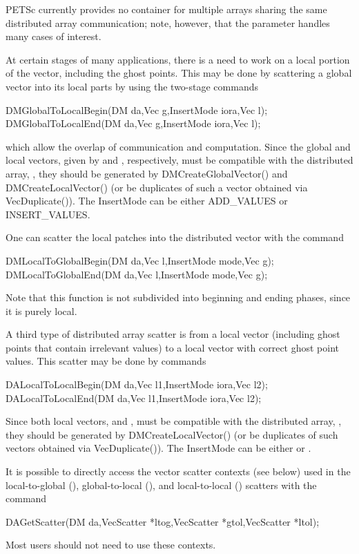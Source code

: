PETSc currently provides no container for multiple arrays sharing the
same distributed array communication; note, however, that the 
parameter handles many cases of interest.

At certain stages of many applications, there is a need to work 
on a local portion of the vector, including the ghost points. 
This may be done by scattering a global vector into its 
local parts by using the two-stage commands
\begin{tabbing}
  DMGlobalToLocalBegin(DM da,Vec g,InsertMode iora,Vec l);\\
  DMGlobalToLocalEnd(DM da,Vec g,InsertMode iora,Vec l);
\end{tabbing}
which allow the overlap of communication and computation.
Since the global and local vectors, given by  and , respectively,
must be compatible with the distributed array, , they should be
generated by DMCreateGlobalVector() 
and DMCreateLocalVector()
(or be duplicates of such a vector obtained via VecDuplicate()).
The InsertMode can be either ADD_VALUES or INSERT_VALUES.

One can scatter the local patches into the distributed vector
with the command
\begin{tabbing}
  DMLocalToGlobalBegin(DM da,Vec l,InsertMode mode,Vec g);
  DMLocalToGlobalEnd(DM da,Vec l,InsertMode mode,Vec g);
\end{tabbing}
Note that this function is not
subdivided into beginning and ending phases, since it is purely local.

A third type of distributed array scatter is from a local
vector (including ghost points that contain irrelevant values) to 
a local vector with correct ghost point values. 
This scatter may be done by
commands
\begin{tabbing}
  DALocalToLocalBegin(DM da,Vec l1,InsertMode iora,Vec l2);\\
  DALocalToLocalEnd(DM da,Vec l1,InsertMode iora,Vec l2);
\end{tabbing}
Since both local vectors,  and ,
must be compatible with the distributed array, , they should be
generated by DMCreateLocalVector()
(or be duplicates of such vectors obtained via VecDuplicate()).
The InsertMode can be either  or .

It is possible to directly access the vector scatter contexts (see below)
used in the local-to-global (), global-to-local 
(), and local-to-local ()
scatters with the command
\begin{tabbing}
  DAGetScatter(DM da,VecScatter *ltog,VecScatter *gtol,VecScatter *ltol);
\end{tabbing}
Most users should not need to use these contexts.

